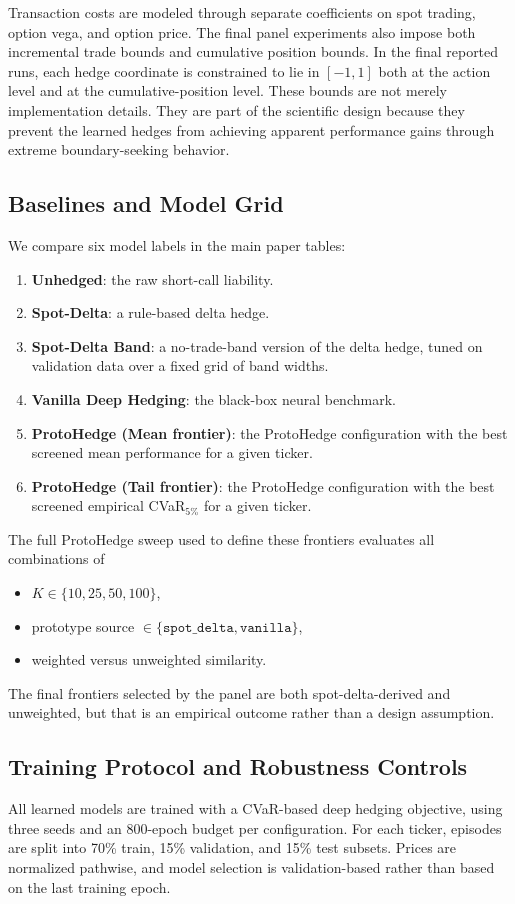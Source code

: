 \documentclass[11pt]{article}
\begin{document}
Transaction costs are modeled through separate coefficients on spot trading, option vega, and option price. The final panel experiments also impose both incremental trade bounds and cumulative position bounds. In the final reported runs, each hedge coordinate is constrained to lie in $[-1,1]$ both at the action level and at the cumulative-position level. These bounds are not merely implementation details. They are part of the scientific design because they prevent the learned hedges from achieving apparent performance gains through extreme boundary-seeking behavior.

\subsection{Baselines and Model Grid}
We compare six model labels in the main paper tables:
\begin{enumerate}[leftmargin=1.5em]
    \item \textbf{Unhedged}: the raw short-call liability.
    \item \textbf{Spot-Delta}: a rule-based delta hedge.
    \item \textbf{Spot-Delta Band}: a no-trade-band version of the delta hedge, tuned on validation data over a fixed grid of band widths.
    \item \textbf{Vanilla Deep Hedging}: the black-box neural benchmark.
    \item \textbf{ProtoHedge (Mean frontier)}: the ProtoHedge configuration with the best screened mean performance for a given ticker.
    \item \textbf{ProtoHedge (Tail frontier)}: the ProtoHedge configuration with the best screened empirical CVaR$_{5\%}$ for a given ticker.
\end{enumerate}

The full ProtoHedge sweep used to define these frontiers evaluates all combinations of
\begin{itemize}
    \item $K \in \{10,25,50,100\}$,
    \item prototype source $\in \{\texttt{spot\_delta},\texttt{vanilla}\}$,
    \item weighted versus unweighted similarity.
\end{itemize}
The final frontiers selected by the panel are both spot-delta-derived and unweighted, but that is an empirical outcome rather than a design assumption.

\subsection{Training Protocol and Robustness Controls}
All learned models are trained with a CVaR-based deep hedging objective, using three seeds and an 800-epoch budget per configuration. For each ticker, episodes are split into 70\% train, 15\% validation, and 15\% test subsets. Prices are normalized pathwise, and model selection is validation-based rather than based on the last training epoch.
\end{document}
